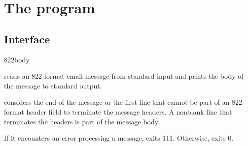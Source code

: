 
\chapter{The  program}

\section{Interface}
\begin{code}
  822body
\end{code}

 reads an 822-format email message from standard input
and prints the body of the message to standard output.

 considers the end of the message or the first line that
cannot be part of an 822-format header field to terminate the message
headers.  A nonblank line that terminates the headers is part of the
message body.

If it encounters an error processing a message,  exits 111.
Otherwise,  exits 0.

